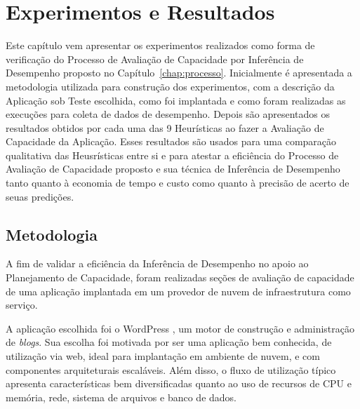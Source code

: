 \chapter{Experimentos e Resultados}
\label{chap:resultados}
Este capítulo vem apresentar os experimentos realizados como forma de
verificação do Processo de Avaliação de Capacidade por Inferência de 
Desempenho proposto no Capítulo~\ref{chap:processo}. Inicialmente é
apresentada a metodologia utilizada para construção dos experimentos, 
com a descrição da Aplicação sob Teste escolhida, como foi implantada e 
como foram realizadas as execuções para coleta de dados de desempenho. Depois
são apresentados os resultados obtidos por cada uma das 9 Heurísticas ao
fazer a Avaliação de Capacidade da Aplicação. Esses resultados são usados 
para uma comparação qualitativa das Heusrísticas entre si e para atestar
a eficiência do Processo de Avaliação de Capacidade proposto e sua técnica 
de Inferência de Desempenho tanto quanto à economia de tempo e custo como  
quanto à precisão de acerto de seuas predições.

\section{Metodologia}
\label{sec:resultados_metodologia}
A fim de validar a eficiência da Inferência de Desempenho no apoio
ao Planejamento de Capacidade, foram realizadas seções de avaliação de
capacidade de uma aplicação implantada em um provedor de nuvem de
infraestrutura como serviço.

A aplicação escolhida foi o WordPress \cite{wordpress}, um motor de construção 
e administração de \emph{blogs}. Sua escolha foi motivada por ser uma aplicação
bem conhecida, de utilização via web, ideal para implantação em ambiente de
nuvem, e com componentes arquiteturais escaláveis. Além disso, o fluxo de 
utilização típico apresenta características bem diversificadas quanto ao uso
de recursos de CPU e memória, rede, sistema de arquivos e banco de dados.

